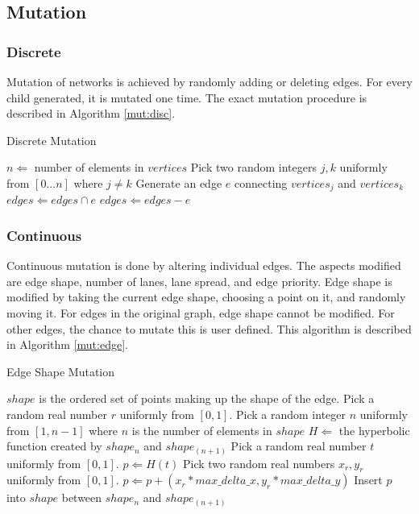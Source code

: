 \documentclass[11pt, oneside, notitlepage, final]{article}
\begin{document}
        \subsection{Mutation}
            
            \subsubsection{Discrete}
            Mutation of networks is achieved by randomly adding or deleting edges. For every child generated, it is mutated one time. The exact mutation procedure is described in Algorithm \ref{mut:disc}.

            \begin{algorithm}
            \caption{Discrete Mutation}
            \label{mut:disc}
            \begin{algorithmic}
            \STATE $n \Leftarrow $ number of elements in $vertices$
            \STATE Pick two random integers $j, k$ uniformly from $[0...n]$ where $j \neq k$
            \STATE Generate an edge $e$ connecting $vertices_j$ and $vertices_k$
            \STATE $edges \Leftarrow edges \cap e$
            \ELSE
            \STATE $edges \Leftarrow edges - e$
            \ENDIF
            \end{algorithmic}
            \end{algorithm}

            \subsubsection{Continuous}
            Continuous mutation is done by altering individual edges. The aspects modified are edge shape, number of lanes, lane spread, and edge priority.
            Edge shape is modified by taking the current edge shape, choosing a point on it, and randomly moving it. For edges in the original graph, edge shape cannot be modified. For other edges, the chance to mutate this is user defined. This algorithm is described in Algorithm \ref{mut:edge}.

            \begin{algorithm}
            \caption{Edge Shape Mutation}
            \label{mut:edge}
            \begin{algorithmic}
            \STATE $shape$ is the ordered set of points making up the shape of the edge.
            \STATE Pick a random real number $r$ uniformly from $[0, 1]$.
            \STATE Pick a random integer $n$ uniformly from $[1, n-1]$ where $n$ is the number of elements in $shape$
            \STATE $H \Leftarrow$ the hyperbolic function created by $shape_n$ and $shape_{(n+1)}$
            \STATE Pick a random real number $t$ uniformly from $[0, 1]$.
            \STATE $p \Leftarrow H(t)$
            \STATE Pick two random real numbers $x_r, y_r$ uniformly from $[0, 1]$.
            \STATE $p \Leftarrow p + (x_r * max\_delta\_x, y_r * max\_delta\_y)$
            \STATE Insert $p$ into $shape$ between $shape_n$ and $shape_{(n+1)}$
            \ENDIF
            \end{algorithmic}
            \end{algorithm}
\end{document}
